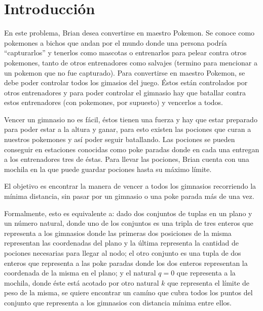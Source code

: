 \section{Introducción}

En este problema, Brian desea convertirse en maestro Pokemon. Se conoce como pokemones a bichos que andan por el mundo donde una persona podría ``capturarlos'' y tenerlos como mascotas o entrenarlos para pelear contra otros pokemones, tanto de otros entrenadores como salvajes (termino para mencionar a un pokemon que no fue capturado). Para convertirse en maestro Pokemon, se debe poder controlar todos los gimasios del juego. Éstos están controlados por otros entrenadores y para poder controlar el gimnasio hay que batallar contra estos entrenadores (con pokemones, por supuesto) y vencerlos a todos. 

Vencer un gimnasio no es fácil, éstos tienen una fuerza y hay que estar preparado para poder estar a la altura y ganar, para esto existen las pociones que curan a nuestros pokemones y así poder seguir batallando. Las pociones se pueden conseguir en estaciones conocidas como poke paradas donde en cada una entregan a los entrenadores tres de éstas. Para llevar las pociones, Brian cuenta con una mochila en la que puede guardar pociones hasta su máximo límite.

El objetivo es encontrar la manera de vencer a todos los gimnasios recorriendo la mínima distancia, sin pasar por un gimnasio o una poke parada más de una vez.

Formalmente, esto es equivalente a: dado dos conjuntos de tuplas en un plano y un número natural, donde uno de los conjuntos es una tripla de tres enteros que representa a los gimnasios donde las primeras dos posiciones de la misma representan las coordenadas del plano y la última representa la cantidad de pociones necesarias para llegar al nodo; el otro conjunto es una tupla de dos enteros que representa a las poke paradas donde los dos enteros representan la coordenada de la misma en el plano; y el natural $q = 0$ que representa a la mochila, donde éste está acotado por otro natural $k$ que representa el límite de peso de la misma, se quiere encontrar un camíno que cubra todos los puntos del conjunto que representa a los gimnasios con distancia mínima entre ellos.


